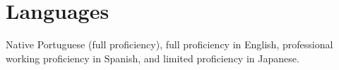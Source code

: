 \section{Languages}

Native Portuguese (full proficiency), 
full proficiency in English, 
professional working proficiency in Spanish, 
and limited proficiency in Japanese.


